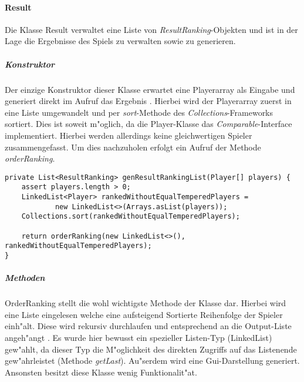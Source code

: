 \paragraph{Result}
\label{par:result}
Die Klasse Result verwaltet eine Liste von \emph{ResultRanking}-Objekten und ist in der Lage die Ergebnisse des Spiels zu verwalten sowie zu generieren. 

\subparagraph{Konstruktor}
Der einzige Konstruktor dieser Klasse erwartet eine Playerarray als Eingabe und generiert direkt im Aufruf das Ergebnis . Hierbei wird der Playerarray zuerst in eine Liste umgewandelt und per \emph{sort}-Methode des \emph{Collections}-Frameworks sortiert. Dies ist soweit m"oglich, da die Player-Klasse das \emph{Comparable}-Interface implementiert. Hierbei werden allerdings keine gleichwertigen Spieler zusammengefasst. Um dies nachzuholen erfolgt ein Aufruf der Methode \emph{orderRanking}.  
\begin{lstlisting}[float,style=CodeHighlighting,caption=Result - Konstruktor,label=lst:result_konstruktor]
private List<ResultRanking> genResultRankingList(Player[] players) {
    assert players.length > 0;
    LinkedList<Player> rankedWithoutEqualTemperedPlayers = 
    		new LinkedList<>(Arrays.asList(players));
    Collections.sort(rankedWithoutEqualTemperedPlayers);

    return orderRanking(new LinkedList<>(), rankedWithoutEqualTemperedPlayers);
}
\end{lstlisting}

\subparagraph{Methoden}
OrderRanking stellt die wohl wichtigste Methode der Klasse dar. Hierbei wird eine Liste eingelesen welche eine aufsteigend Sortierte Reihenfolge der Spieler einh"alt. Diese wird rekursiv durchlaufen und entsprechend an die Output-Liste angeh"angt . Es wurde hier bewusst ein spezieller Listen-Typ (LinkedList) gew"ahlt, da dieser Typ die M"oglichkeit des direkten Zugriffs auf das Listenende gew"ahrleistet (Methode \emph{getLast}). Au"serdem wird eine Gui-Darstellung generiert. Ansonsten besitzt diese Klasse wenig Funktionalit"at. 

